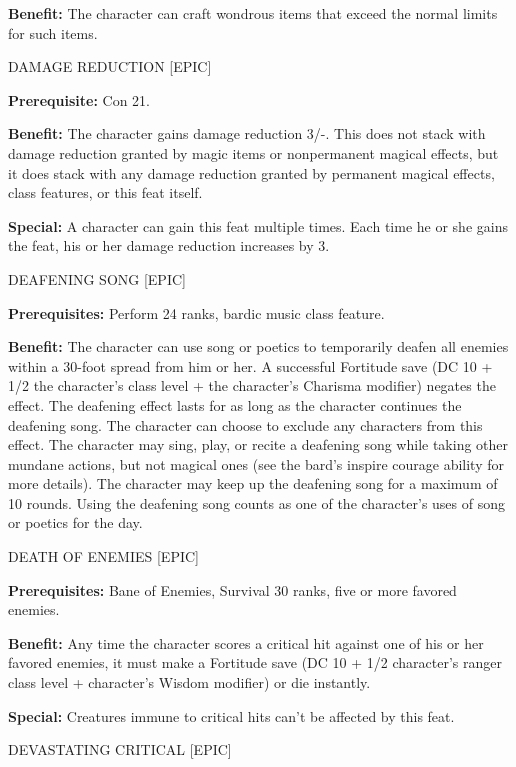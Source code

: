 \documentclass{article}
\begin{document}
\textbf{Benefit:} The character can craft wondrous items that exceed the normal 
limits for such items. 

\vspace{12pt}
DAMAGE REDUCTION [EPIC] 

\textbf{Prerequisite:} Con 21. 

\textbf{Benefit:} The character gains damage reduction 3/-. This does not stack 
with damage reduction granted by magic items or nonpermanent magical effects, but 
it does stack with any damage reduction granted by permanent magical effects, class 
features, or this feat itself. 

\textbf{Special:} A character can gain this feat multiple times. Each time he or 
she gains the feat, his or her damage reduction increases by 3. 

\vspace{12pt}
DEAFENING SONG [EPIC] 

\textbf{Prerequisites:} Perform 24 ranks, bardic music class feature. 

\textbf{Benefit:} The character can use song or poetics to temporarily deafen all 
enemies within a 30-foot spread from him or her. A successful Fortitude save (DC 
10 + 1/2 the character's class level + the character's Charisma modifier) negates 
the effect. The deafening effect lasts for as long as the character continues the 
deafening song. The character can choose to exclude any characters from this effect. 
The character may sing, play, or recite a deafening song while taking other mundane 
actions, but not magical ones (see the bard's inspire courage ability for more 
details). The character may keep up the deafening song for a maximum of 10 rounds. 
Using the deafening song counts as one of the character's uses of song or poetics 
for the day. 

\vspace{12pt}
DEATH OF ENEMIES [EPIC] 

\textbf{Prerequisites:} Bane of Enemies, Survival 30 ranks, five or more favored 
enemies. 

\textbf{Benefit:} Any time the character scores a critical hit against one of his 
or her favored enemies, it must make a Fortitude save (DC 10 + 1/2 character's 
ranger class level + character's Wisdom modifier) or die instantly.

\textbf{Special:} Creatures immune to critical hits can't be affected by this feat. 

\vspace{12pt}
DEVASTATING CRITICAL [EPIC] 
\end{document}
